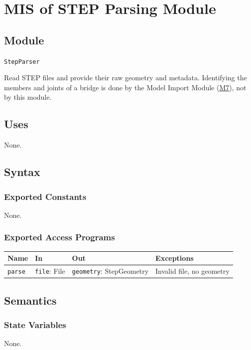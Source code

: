 \documentclass[12pt, titlepage]{article}
\begin{document}
\newpage

\section{MIS of STEP Parsing Module} \label{mStep}

\subsection{Module}
\texttt{StepParser}

Read STEP files and provide their raw geometry and metadata. Identifying the members and joints of a bridge is done by the Model Import Module (\hyperref[mModelImport]{M7}), not by this module.

\subsection{Uses}
None.

\subsection{Syntax}

\subsubsection{Exported Constants}
None.

\subsubsection{Exported Access Programs}
\begin{tabularx}{\textwidth}{p{2.7cm} p{3.6cm} p{4.0cm} X}
\toprule
\textbf{Name} & \textbf{In} & \textbf{Out} & \textbf{Exceptions} \\
\midrule
\texttt{parse} & \texttt{file}: File & \texttt{geometry}: StepGeometry & Invalid file, no geometry \\
\bottomrule
\end{tabularx}

\subsection{Semantics}

\subsubsection{State Variables}
None.
\end{document}
